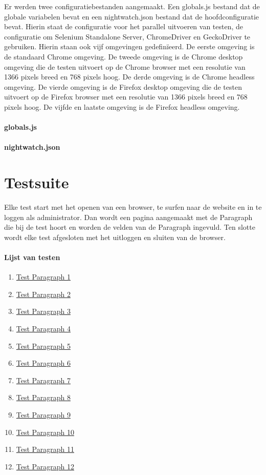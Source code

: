 Er werden twee configuratiebestanden aangemaakt. Een globals.js bestand dat de globale variabelen bevat en een nightwatch.json bestand dat de hoofdconfiguratie bevat. Hierin staat de configuratie voor het parallel uitvoeren van testen, de configuratie om Selenium Standalone Server, ChromeDriver en GeckoDriver te gebruiken. Hierin staan ook vijf omgevingen gedefinïeerd. De eerste omgeving is de standaard Chrome omgeving. De tweede omgeving is de Chrome desktop omgeving die de testen uitvoert op de Chrome browser met een resolutie van 1366 pixels breed en 768 pixels hoog. De derde omgeving is de Chrome \gls{headless} omgeving. De vierde omgeving is de Firefox desktop omgeving die de testen uitvoert op de Firefox browser met een resolutie van 1366 pixels breed en 768 pixels hoog. De vijfde en laatste omgeving is de Firefox \gls{headless} omgeving.

\paragraph{globals.js}

\paragraph{nightwatch.json}


\clearpage
\section{Testsuite}
Elke test start met het openen van een browser, te surfen naar de website en in te loggen als administrator. Dan wordt een pagina aangemaakt met de Paragraph die bij de test hoort en worden de velden van de Paragraph ingevuld. Ten slotte wordt elke test afgesloten met het uitloggen en sluiten van de browser.

\paragraph{Lijst van testen}
\begin{enumerate}
\item \hyperref[test1]{Test Paragraph 1}
\item \hyperref[test2]{Test Paragraph 2}
\item \hyperref[test3]{Test Paragraph 3}
\item \hyperref[test4]{Test Paragraph 4}
\item \hyperref[test5]{Test Paragraph 5}
\item \hyperref[test6]{Test Paragraph 6}
\item \hyperref[test7]{Test Paragraph 7}
\item \hyperref[test8]{Test Paragraph 8}
\item \hyperref[test9]{Test Paragraph 9}
\item \hyperref[test10]{Test Paragraph 10}
\item \hyperref[test11]{Test Paragraph 11}
\item \hyperref[test12]{Test Paragraph 12}
\end{enumerate}

